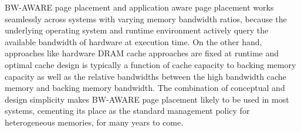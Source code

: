 BW-AWARE page placement and application aware page placement works seamlessly
across systems with varying memory bandwidth ratios, because the
underlying operating system and runtime environment actively query the available
bandwidth of hardware at execution time. On the other hand, approaches like hardware
DRAM cache approaches are fixed at runtime and optimal cache design is typically
a function of cache capacity to backing memory capacity as well as the relative
bandwidths between the high bandwidth cache memory and backing memory bandwidth.
The combination of conceptual and design simplicity makes BW-AWARE page
placement likely to be used in most systems,
cementing its place as the standard management policy for heterogeneous
memories, for many years to come.


